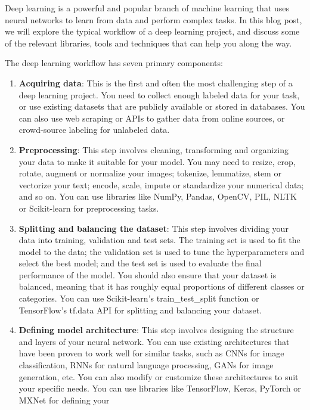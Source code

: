 \documentclass[
  letterpaper,
  DIV=11,
  numbers=noendperiod]{scrreprt}
\providecommand{\tightlist}{%
  \setlength{\itemsep}{0pt}\setlength{\parskip}{0pt}}\usepackage{longtable,booktabs,array}
\begin{document}
Deep learning is a powerful and popular branch of machine learning that
uses neural networks to learn from data and perform complex tasks. In
this blog post, we will explore the typical workflow of a deep learning
project, and discuss some of the relevant libraries, tools and
techniques that can help you along the way.

The deep learning workflow has seven primary components:

\begin{enumerate}
\def\labelenumi{\arabic{enumi}.}
\tightlist
\item
  \textbf{Acquiring data}: This is the first and often the most
  challenging step of a deep learning project. You need to collect
  enough labeled data for your task, or use existing datasets that are
  publicly available or stored in databases. You can also use web
  scraping or APIs to gather data from online sources, or crowd-source
  labeling for unlabeled data.
\item
  \textbf{Preprocessing}: This step involves cleaning, transforming and
  organizing your data to make it suitable for your model. You may need
  to resize, crop, rotate, augment or normalize your images; tokenize,
  lemmatize, stem or vectorize your text; encode, scale, impute or
  standardize your numerical data; and so on. You can use libraries like
  NumPy, Pandas, OpenCV, PIL, NLTK or Scikit-learn for preprocessing
  tasks.
\item
  \textbf{Splitting and balancing the dataset}: This step involves
  dividing your data into training, validation and test sets. The
  training set is used to fit the model to the data; the validation set
  is used to tune the hyperparameters and select the best model; and the
  test set is used to evaluate the final performance of the model. You
  should also ensure that your dataset is balanced, meaning that it has
  roughly equal proportions of different classes or categories. You can
  use Scikit-learn's train\_test\_split function or TensorFlow's tf.data
  API for splitting and balancing your dataset.
\item
  \textbf{Defining model architecture}: This step involves designing the
  structure and layers of your neural network. You can use existing
  architectures that have been proven to work well for similar tasks,
  such as CNNs for image classification, RNNs for natural language
  processing, GANs for image generation, etc. You can also modify or
  customize these architectures to suit your specific needs. You can use
  libraries like TensorFlow, Keras, PyTorch or MXNet for defining your

\end{enumerate}
\end{document}
